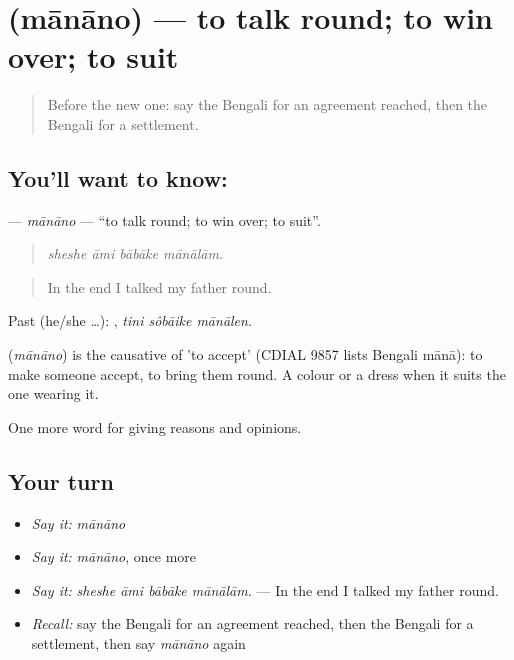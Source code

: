 \section[\texorpdfstring{\bn{মানানো} (mānāno)}{মানানো (mānāno)}]{ (mānāno) — to talk round; to win over; to suit}

\label{lesson:BN-C365-manano}



\begin{quote}
Before the new one: say the Bengali for an agreement reached, then the Bengali for a settlement.
\end{quote}

\subsection*{You'll want to know: }
\textbf{} — \emph{mānāno} — \textquotedblleft{}to talk round; to win over; to suit\textquotedblright{}.

\begin{quote}
   
\end{quote}

\begin{quote}
\emph{sheshe āmi bābāke mānālām.}
\end{quote}

\begin{quote}
In the end I talked my father round.
\end{quote}

Past (he/she …):   , \emph{tini sôbāike mānālen}.

\begin{cousinweb}
\textbf{} (\emph{mānāno}) is the causative of  'to accept' (CDIAL 9857 lists Bengali mānā): to make someone accept, to bring them round. A colour or a dress  when it suits the one wearing it.
\end{cousinweb}

\begin{grammarlens}[title={What you've built}]
One more word for giving reasons and opinions.
\end{grammarlens}

\subsection*{Your turn}
\begin{itemize}
\raggedright
  \item \emph{Say it:} \emph{mānāno}
  \item \emph{Say it:} \emph{mānāno}, once more
  \item \emph{Say it:} \emph{sheshe āmi bābāke mānālām.} — In the end I talked my father round.
  \item \emph{Recall:} say the Bengali for an agreement reached, then the Bengali for a settlement, then say \emph{mānāno} again
\end{itemize}

